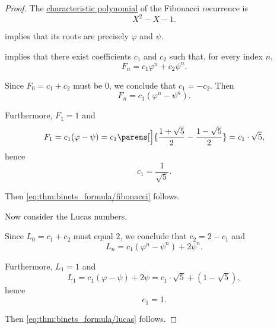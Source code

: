 \begin{proof}
  The \hyperref[def:linear_recurrence_characteristic_polynomial]{characteristic polynomial} of the Fibonacci recurrence is
  \begin{equation*}
    X^2 - X - 1.
  \end{equation*}

   implies that its roots are precisely \( \varphi \) and \( \psi \).

    implies that there exist coefficients \( c_1 \) and \( c_2 \) such that, for every index \( n \),
  \begin{equation*}
    F_n = c_1 \varphi^n + c_2 \psi^n.
  \end{equation*}

  Since \( F_0 = c_1 + c_2 \) must be \( 0 \), we conclude that \( c_1 = -c_2 \). Then
  \begin{equation*}
    F_n = c_1 (\varphi^n - \psi^n).
  \end{equation*}

  Furthermore, \( F_1 = 1 \) and
  \begin{equation*}
    F_1 = c_1 (\varphi - \psi) = c_1 \parens[\Big]{ \frac {1 + \sqrt 5} 2 - \frac {1 - \sqrt 5} 2 } = c_1 \cdot \sqrt 5,
  \end{equation*}
  hence
  \begin{equation*}
    c_1 = \frac 1 {\sqrt 5}.
  \end{equation*}

  Then \eqref{eq:thm:binets_formula/fibonacci} follows.

   Now consider the Lucas numbers.

  Since \( L_0 = c_1 + c_2 \) must equal \( 2 \), we conclude that \( c_2 = 2 - c_1 \) and
  \begin{equation*}
    L_n = c_1 (\varphi^n - \psi^n) + 2 \psi^n.
  \end{equation*}

  Furthermore, \( L_1 = 1 \) and
  \begin{equation*}
    L_1 = c_1 (\varphi - \psi) + 2 \psi = c_1 \cdot \sqrt 5 + (1 - \sqrt 5),
  \end{equation*}
  hence
  \begin{equation*}
    c_1 = 1.
  \end{equation*}

  Then \eqref{eq:thm:binets_formula/lucas} follows.
\end{proof}
